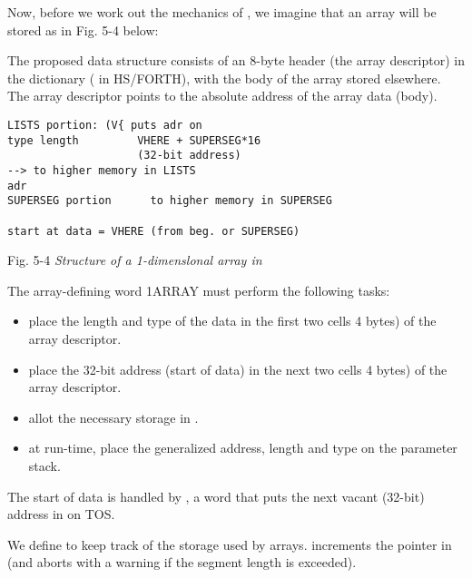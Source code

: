 Now, before we work out the mechanics of , we imagine that an array will be stored as in Fig. 5-4 below:

The proposed data structure consists of an 8-byte header (the array descriptor) in the dictionary ( in HS/FORTH), with the body of the array stored elsewhere. The array descriptor points to the absolute address of the array data (body).

\begin{lstlisting}
LISTS portion: (V{ puts adr on
type length         VHERE + SUPERSEG*16
                    (32-bit address)
--> to higher memory in LISTS 
adr
SUPERSEG portion      to higher memory in SUPERSEG

start at data = VHERE (from beg. or SUPERSEG)
\end{lstlisting}

Fig. 5-4 \textit{Structure of a 1-dimenslonal array in }

The array-defining word 1ARRAY must perform the following
tasks:

\begin{itemize}
    \item place the length and type of the data in the first two cells 4 bytes) of the array descriptor.
    \item place the 32-bit address (start of data) in the next two cells 4 bytes) of the array descriptor.
    \item allot the necessary storage in .
    \item at run-time, place the generalized address, length and type on the parameter stack.
\end{itemize}

The start of data is handled by , a word that puts the next vacant (32-bit) address in  on TOS.

We define  to keep track of the storage used by arrays.  increments the pointer in  (and aborts with a warning if the segment length is exceeded).

